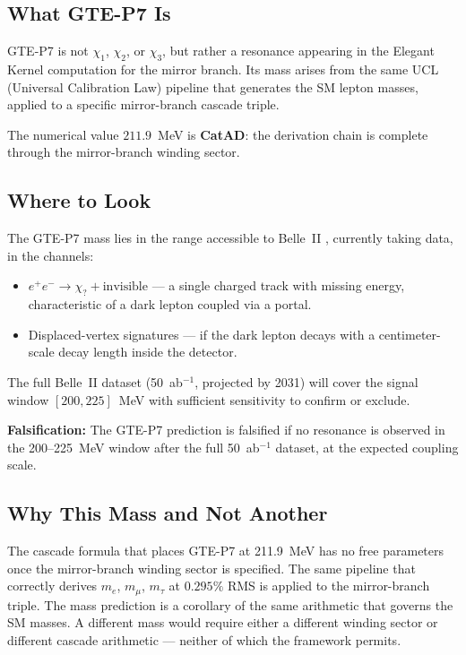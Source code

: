 \documentclass[11pt,a4paper]{article}
\newcommand{\CatAD}{\textbf{CatAD}}
\begin{document}
\subsection{What GTE-P7 Is}

GTE-P7 is not $\chi_1$, $\chi_2$, or $\chi_3$, but rather a resonance
appearing in the Elegant Kernel computation for the mirror branch.  Its mass
arises from the same UCL (Universal Calibration Law) pipeline that generates the
SM lepton masses, applied to a specific mirror-branch cascade triple.

The numerical value $211.9$~MeV is \CatAD: the derivation chain is complete
through the mirror-branch winding sector.

\subsection{Where to Look}

The GTE-P7 mass lies in the range accessible to Belle~II
\cite{SpivackGTECompleteFramework}, currently taking data, in the channels:
\begin{itemize}[itemsep=3pt]
  \item $e^+e^- \to \chi_? + \text{invisible}$ — a single charged track with
    missing energy, characteristic of a dark lepton coupled via a portal.
  \item Displaced-vertex signatures — if the dark lepton decays with a
    centimeter-scale decay length inside the detector.
\end{itemize}
The full Belle~II dataset (50~ab$^{-1}$, projected by 2031) will cover the
signal window $[200, 225]$~MeV with sufficient sensitivity to confirm or exclude.

\textbf{Falsification:} The GTE-P7 prediction is falsified if no resonance is
observed in the 200--225~MeV window after the full 50~ab$^{-1}$ dataset, at
the expected coupling scale.

\subsection{Why This Mass and Not Another}

The cascade formula that places GTE-P7 at 211.9~MeV has no free parameters once
the mirror-branch winding sector is specified.  The same pipeline that correctly
derives $m_e$, $m_\mu$, $m_\tau$ at $0.295\%$ RMS is applied to the
mirror-branch triple.  The mass prediction is a corollary of the same arithmetic
that governs the SM masses.  A different mass would require either a different
winding sector or different cascade arithmetic — neither of which the framework
permits.
\end{document}
